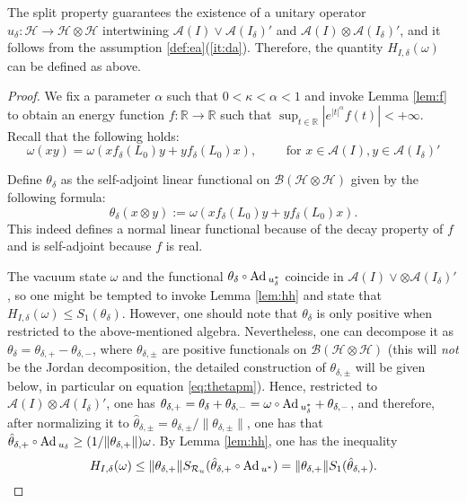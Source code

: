 \documentclass[a4paper,12pt]{article}
\theoremstyle{plain}
\theoremstyle{definition}
\theoremstyle{remark}
\newcommand{\compcent}[1]{\vcenter{\hbox{$#1\circ$}}}
\newcommand{\comp}{\mathbin{\mathchoice
{\compcent\scriptstyle}{\compcent\scriptstyle}
{\compcent\scriptscriptstyle}{\compcent\scriptscriptstyle}}}
\def\A{{\mathcal A}}
\def\B{{\mathcal B}}
\def\H{{\mathcal H}}
\def\R{{\mathcal R}}
\def\R{{\mathcal R}}
\def\Ad{{\hbox{\rm Ad\,}}}
\begin{document}
The split property guarantees the existence of a unitary operator $u_\delta: \H\to\H\otimes\H$ intertwining $\A(I)\vee\A(I_\delta)'$ and $\A(I)\otimes\A(I_\delta)'$,
and it follows from the assumption \ref{def:ea}(\ref{it:da}). Therefore, the quantity $H_{I,\delta}(\omega)$ can be defined as above.

\begin{proof}
We fix a parameter $\alpha$ such that $0<\kappa<\alpha<1$ and invoke Lemma \ref{lem:f} to obtain an energy function $f:\mathbb{R}\to\mathbb{R}$
such that $\sup_{t\in\mathbb{R}}\left|e^{|t|^\alpha}f(t)\right| < +\infty$. Recall that the following holds:
\[
\omega(xy) = \omega(x f_\delta(L_0) y + y f_\delta(L_0) x), \qquad \text{ for } x\in\A(I), y\in\A(I_\delta)'
\]

Define $\theta_\delta$ as the self-adjoint linear functional on $\B(\H\otimes\H)$ given by the following formula:
\begin{equation}\label{eq:thetad}
 \theta_\delta(x\otimes y) := \omega( x f_\delta(L_0) y + y f_\delta(L_0) x).
\end{equation}
This indeed defines a normal linear functional because of the decay property of $f$
and is self-adjoint because $f$ is real.

The vacuum state $\omega$ and the functional $\theta_\delta \comp \Ad_{u_\delta^*}$  coincide in $\A(I)\vee{\otimes}\A(I_\delta)'$, so one might be tempted to invoke Lemma \ref{lem:hh} and state that $H_{I,\delta}(\omega) \le S_1(\theta_\delta)$. However, one should note that $\theta_\delta$ is only positive when restricted to the above-mentioned algebra. Nevertheless, one can decompose it as $\theta_\delta = \theta_{\delta,+} - \theta_{\delta,-}$, where $\theta_{\delta,\pm}$ are positive functionals on $\B(\H\otimes\H)$
(this will {\it not} be the Jordan decomposition, the detailed construction of $\theta_{\delta,\pm}$ will be given below, in particular on equation \eqref{eq:thetapm}).
Hence, restricted to $\A(I)\otimes\A(I_\delta)'$, one has $\theta_{\delta,+} = \theta_\delta + \theta_{\delta,-} = \omega\comp\Ad_{u_\delta^*} + \theta_{\delta,-}$, and therefore, after normalizing it to $\hat{\theta}_{\delta,\pm} = \theta_{\delta,\pm}/\|\theta_{\delta,\pm}\|$, one has that $\hat{\theta}_{\delta,+}\comp\Ad_{u_\delta} \ge (1/\|\theta_{\delta,+}\|) \omega$. By Lemma \ref{lem:hh}, one has the inequality
\begin{equation*}
H_{I,\delta}(\omega) \le \|\theta_{\delta,+}\|S_{\R_u}(\hat{\theta}_{\delta,+}\comp \Ad_{u^*}) = \|\theta_{\delta,+}\|S_1(\hat{\theta}_{\delta,+}). 
\end{equation*}


\end{proof}
\end{document}

